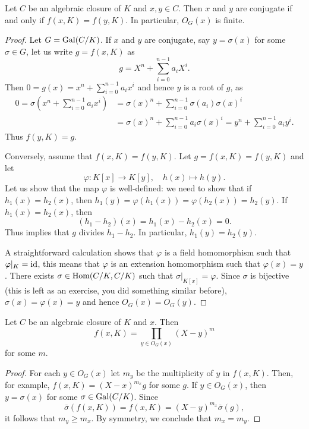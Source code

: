 \begin{proposition}
    Let $C$ be an algebraic closure of $K$ and $x,y\in C$. Then 
    $x$ and $y$ are conjugate if and only if $f(x,K)=f(y,K)$. In particular, 
    $O_G(x)$ is finite. 
\end{proposition}

\begin{proof}
    Let $G=\operatorname{Gal}(C/K)$. 
    If $x$ and $y$ are conjugate, say $y=\sigma(x)$ for some $\sigma\in G$, 
    let us write $g=f(x,K)$ as 
    \[
    g=X^n+\sum_{i=0}^{n-1} a_iX^i. 
    \]
    Then $0=g(x)=x^n+\sum_{i=0}^{n-1}a_ix^i$ and hence $y$ is
    a root of $g$, as 
    \begin{align*}
    0=\sigma\left(x^n+\sum_{i=0}^{n-1}a_ix^i\right)
    &=\sigma(x)^n+\sum_{i=0}^{n-1}\sigma(a_i)\sigma(x)^i\\
    &=\sigma(x)^n+\sum_{i=0}^{n-1}a_i\sigma(x)^i
    =y^n+\sum_{i=0}^{n-1}a_iy^i.
    \end{align*}
    Thus $f(y,K)=g$. 
    
    Conversely, assume that $f(x,K)=f(y,K)$. Let
    $g=f(x,K)=f(y,K)$ and let 
    \[
    \varphi\colon K[x]\to K[y],
    \quad
    h(x)\mapsto h(y).
    \]
    Let us show that the map $\varphi$ is well-defined: we need to show 
    that if 
    $h_1(x)=h_2(x)$, then $h_1(y)=\varphi(h_1(x))=\varphi(h_2(x))=h_2(y)$. 
    If $h_1(x)=h_2(x)$, then 
    \[
    (h_1-h_2)(x)=h_1(x)-h_2(x)=0.
    \]
    Thus implies
    that $g$ divides $h_1-h_2$. In particular, $h_1(y)=h_2(y)$.
    
    A straightforward calculation shows that $\varphi$ is a field 
    homomorphism such that $\varphi|_K=\operatorname{id}$, this means that
    $\varphi$ is 
    an extension homomorphism such that $\varphi(x)=y$. There exists
    $\sigma\in\operatorname{Hom}(C/K,C/K)$ such that 
    $\sigma|_{K[x]}=\varphi$. Since $\sigma$ is bijective 
    (this is left as an exercise, you did something similar before), 
    $\sigma(x)=\varphi(x)=y$ and hence 
    $O_G(x)=O_G(y)$. 
\end{proof}

\begin{proposition}
    Let $C$ be an algebraic closure of $K$ and $x$. Then 
    \[
    f(x,K)=\prod_{y\in O_G(x)}(X-y)^m
    \]
    for some $m$. 
\end{proposition}

\begin{proof}
    For each $y\in O_G(x)$ let $m_y$ be the multiplicity
    of $y$ in $f(x,K)$. 
    Then, for example,
    $f(x,K)=(X-x)^{m_x}g$ for some $g$. If $y\in O_G(x)$, 
    then $y=\sigma(x)$ for some $\sigma\in\operatorname{Gal}(C/K)$. Since
    \[
    \overline{\sigma}(f(x,K))=f(x,K)=(X-y)^{m_x}\overline{\sigma}(g), 
    \]
    it follows that $m_y\geq m_x$. By symmetry, 
    we conclude that $m_x=m_y$. 
\end{proof}

